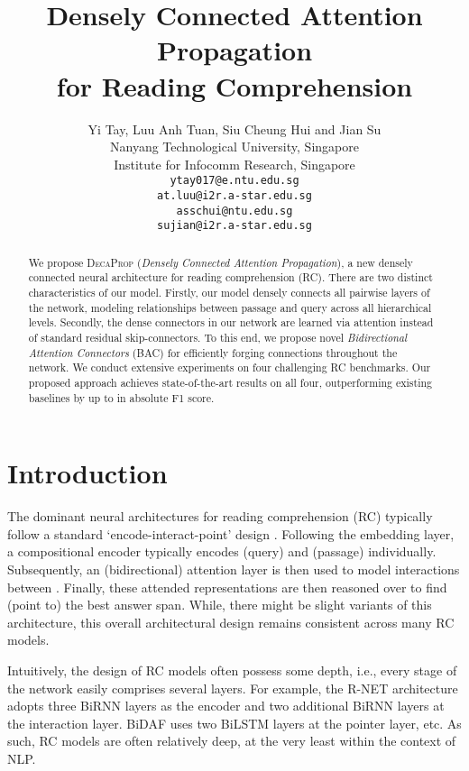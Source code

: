 \documentclass{article}
\title{Densely Connected Attention Propagation \\ for Reading Comprehension}
\author{
  \:\:Yi Tay, \:\:Luu Anh Tuan, Siu Cheung Hui and Jian Su \\
  Nanyang Technological University, Singapore\\
  Institute for Infocomm Research, Singapore \\
  \texttt{ytay017@e.ntu.edu.sg}\\
  \texttt{at.luu@i2r.a-star.edu.sg}\\
  \texttt{asschui@ntu.edu.sg} \\
  \texttt{sujian@i2r.a-star.edu.sg} \\
}
\begin{document}
\maketitle

\begin{abstract}

We propose \textsc{DecaProp} (\textit{Densely Connected Attention Propagation}), a new densely connected neural architecture for reading comprehension (RC). There are two distinct characteristics of our model. Firstly, our model densely connects all pairwise layers of the network, modeling relationships between passage and query across all hierarchical levels. Secondly, the dense connectors in our network are learned via attention instead of standard residual skip-connectors. To this end, we propose novel \textit{Bidirectional Attention Connectors} (BAC) for efficiently forging connections throughout the network. We conduct extensive experiments on four challenging RC benchmarks. Our proposed approach achieves state-of-the-art results on all four, outperforming existing baselines by up to  in absolute F1 score.
\end{abstract}


\section{Introduction}
The dominant neural architectures for reading comprehension (RC) typically follow a standard `encode-interact-point' design \citep{wang2016machine,seo2016bidirectional,DBLP:journals/corr/XiongZS16,wang2017gated,kundu2018amanda}. Following the embedding layer, a compositional encoder typically encodes  (query) and  (passage) individually. Subsequently, an (bidirectional) attention layer is then used to model interactions between . Finally, these attended representations are then reasoned over to find (point to) the best answer span. While, there might be slight variants of this architecture, this overall architectural design remains consistent across many RC models.

Intuitively, the design of RC models often possess some depth, i.e., every stage of the network easily comprises several layers. For example, the R-NET \citep{wang2017gated} architecture adopts three BiRNN layers as the encoder and two additional BiRNN layers at the interaction layer. BiDAF \citep{seo2016bidirectional} uses two BiLSTM layers at the pointer layer, etc. As such, RC models are often relatively deep, at the very least within the context of NLP.
\end{document}
